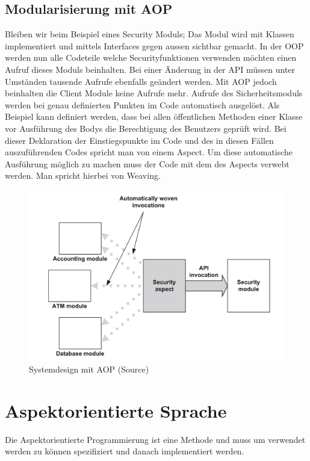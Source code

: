 \subsection{Modularisierung mit AOP}
\label{sec:aop_modaop}
Bleiben wir beim Beispiel eines Security Moduls; Das Modul wird mit Klassen implementiert und mittels Interfaces gegen aussen sichtbar gemacht. In der OOP werden nun alle Codeteile welche Securityfunktionen verwenden möchten einen Aufruf dieses Moduls beinhalten. Bei einer Änderung in der API müssen unter Umständen tausende Aufrufe ebenfalls geändert werden. Mit AOP jedoch beinhalten die Client Module keine Aufrufe mehr. Aufrufe des Sicherheitsmoduls werden bei genau definierten Punkten im Code automatisch ausgelöst. Als Beispiel kann definiert werden, dass bei allen öffentlichen Methoden einer Klasse vor Ausführung des Bodys die Berechtigung des Benutzers geprüft wird. Bei dieser Deklaration der Einstiegspunkte im Code und des in diesen Fällen auszuführenden Codes spricht man von einem Aspect. Um diese automatische Ausführung möglich zu machen muss der Code mit dem des Aspects verwebt werden. Man spricht hierbei von Weaving.
\begin{figure}[H]
	\centering
		\includegraphics[scale=0.5]{bilder/motivationAop.png}
	\caption{Systemdesign mit AOP (Source\cite[p~55]{laddad:aspectj})}
	\label{fig:motivationaop}
\end{figure}

\section{Aspektorientierte Sprache}
\label{sec:aop_lang}
Die Aspektorientierte Programmierung ist eine Methode und muss um verwendet werden zu können spezifiziert und danach implementiert werden.

